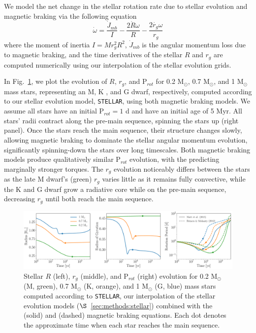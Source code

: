 \documentclass[twocolumn]{aastex61}
\newcommand{\stellar}[0]{\texttt{STELLAR}\xspace}
\begin{document}
We model the net change in the stellar rotation rate due to stellar evolution and magnetic braking via the following equation 
\begin{equation} \label{eqn:stellar_rot_rate_dt}
\dot{\omega} = \frac{\dot{J}_{mb}}{I} - \frac{2 \dot{R} \omega}{R} - \frac{2 \dot{r_g} \omega}{r_g}
\end{equation}
where the moment of inertia $I = M r_g^2 R^2$, $\dot{J}_{mb}$ is the angular momentum loss due to magnetic braking, and the time derivatives of the stellar $R$ and $r_g$ are computed numerically using our interpolation of the \citet{Baraffe2015} stellar evolution grids.  

In Fig.~\ref{fig:stellarExample}, we plot the evolution of $R$, $r_g$, and P$_{rot}$ for 0.2 M$_{\odot}$, 0.7 M$_{\odot}$, and 1 M$_{\odot}$ mass stars, representing an M, K , and G dwarf, respectively, computed according to our stellar evolution model, \stellar, using both magnetic braking models. We assume all stars have an initial P$_{rot} = 1$ d and have an initial age of 5 Myr. All stars' radii contract along the pre-main sequence, spinning the stars up (right panel). Once the stars reach the main sequence, their structure changes slowly, allowing magnetic braking to dominate the stellar angular momentum evolution, significantly spinning-down the stars over long timescales. Both magnetic braking models produce qualitatively similar P$_{rot}$ evolution, with the \citet{Reiners2012} predicting marginally stronger torques. The $r_g$ evolution noticeably differs between the stars as the late M dwarf's (green) $r_g$ varies little as it remains fully convective, while the K and G dwarf grow a radiative core while on the pre-main sequence, decreasing $r_g$ until both reach the main sequence.

\begin{figure}[ht]
	\includegraphics[width=\textwidth]{../Plots/stellarExample.pdf}
   \caption{Stellar $R$ (left), $r_g$ (middle), and P$_{rot}$ (right) evolution for 0.2 M$_{\odot}$ (M, green), 0.7 M$_{\odot}$ (K, orange), and 1 M$_{\odot}$ (G, blue) mass stars computed according to \stellar, our interpolation of the \citet{Baraffe2015} stellar evolution models ($\S$~\ref{sec:methods:stellar}) combined with the \citet{Matt2015} (solid) and \citet{Reiners2012} (dashed) magnetic braking equations. Each dot denotes the approximate time when each star reaches the main sequence.}%
    \label{fig:stellarExample}%
\end{figure}
\end{document}
